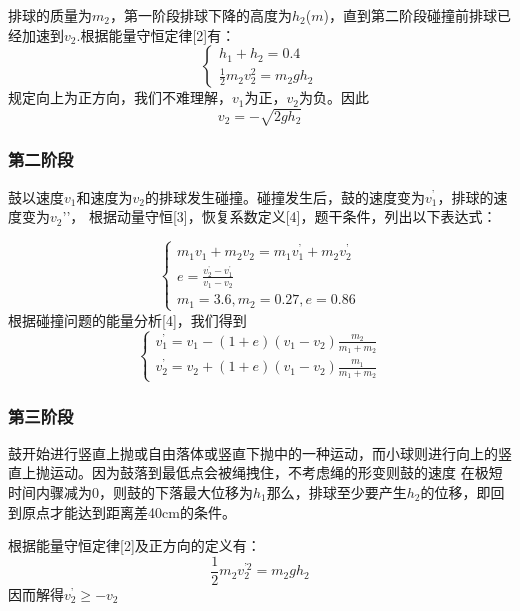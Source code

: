 \documentclass[UTF8]{article}
\begin{document}
排球的质量为$m_2$，第一阶段排球下降的高度为$h_2$($m$)，直到第二阶段碰撞前排球已经加速到$v_2$.根据能量守恒定律[2]有：
\begin{equation}
    \begin{cases}
        h_1+h_2=0.4\\
        \frac{1}{2}m_2v_2^2=m_2gh_2
    \end{cases}
\end{equation}
规定向上为正方向，我们不难理解，$v_1$为正，$v_2$为负。因此
\begin{equation}
    v_2=-\sqrt{2gh_2}
\end{equation}

\subsubsection{第二阶段}
鼓以速度$v_1$和速度为$v_2$的排球发生碰撞。碰撞发生后，鼓的速度变为$v_1^{\mbox{'}}$，排球的速度变为$v_2{\mbox{'}}$'，
根据动量守恒[3]，恢复系数定义[4]，题干条件，列出以下表达式：

\begin{equation}
    \begin{cases}
        m_1v_1+m_2v_2=m_1v_1^{\mbox{'}}+m_2v_2^{\mbox{'}}\\
        e=\frac{v_2^{\mbox{'}}-v_1^{\mbox{'}}}{v_1-v_2}\\
        m_1=3.6,m_2=0.27,e=0.86
    \end{cases}
\end{equation}
根据碰撞问题的能量分析[4]，我们得到
\begin{equation}
    \begin{cases}
        v_1^{\mbox{'}}=v_1-(1+e)(v_1-v_2)\frac{m_2}{m_1+m_2}\\
        v_2^{\mbox{'}}=v_2+(1+e)(v_1-v_2)\frac{m_1}{m_1+m_2}
    \end{cases}
\end{equation}

\subsubsection{第三阶段}
鼓开始进行竖直上抛或自由落体或竖直下抛中的一种运动，而小球则进行向上的竖直上抛运动。因为鼓落到最低点会被绳拽住，不考虑绳的形变则鼓的速度
在极短时间内骤减为0，则鼓的下落最大位移为$h_1$那么，排球至少要产生$h_2$的位移，即回到原点才能达到距离差40cm的条件。

根据能量守恒定律[2]及正方向的定义有：
\begin{equation}
    \frac{1}{2}m_2v_2^{\mbox{'2}}=m_2gh_2
\end{equation}
因而解得$v_2^{\mbox{'}}\ge-v_2$
\end{document}
